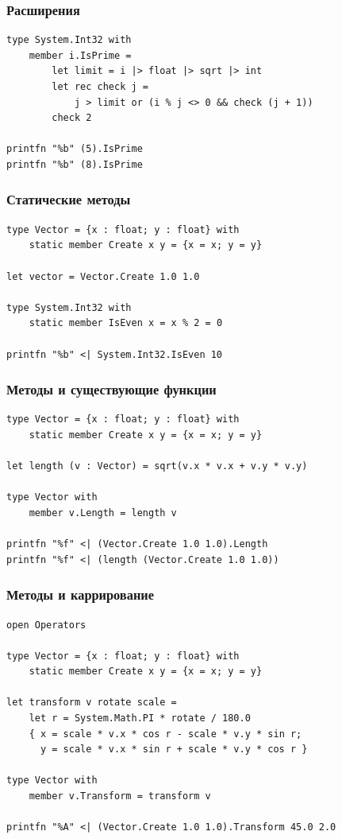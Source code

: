 \documentclass{../../slides-style}
\begin{document}
    \begin{frame}[fragile]
        \frametitle{Расширения}
        \begin{verbatim}
type System.Int32 with
    member i.IsPrime = 
        let limit = i |> float |> sqrt |> int
        let rec check j =
            j > limit or (i % j <> 0 && check (j + 1))
        check 2

printfn "%b" (5).IsPrime
printfn "%b" (8).IsPrime
        \end{verbatim}
    \end{frame}

    \begin{frame}[fragile]
        \frametitle{Статические методы}
        \begin{verbatim}
type Vector = {x : float; y : float} with
    static member Create x y = {x = x; y = y}

let vector = Vector.Create 1.0 1.0

type System.Int32 with
    static member IsEven x = x % 2 = 0

printfn "%b" <| System.Int32.IsEven 10
        \end{verbatim}
    \end{frame}

    \begin{frame}[fragile]
        \frametitle{Методы и существующие функции}
        \begin{verbatim}
type Vector = {x : float; y : float} with
    static member Create x y = {x = x; y = y}

let length (v : Vector) = sqrt(v.x * v.x + v.y * v.y)

type Vector with
    member v.Length = length v

printfn "%f" <| (Vector.Create 1.0 1.0).Length
printfn "%f" <| (length (Vector.Create 1.0 1.0))
        \end{verbatim}
    \end{frame}

    \begin{frame}[fragile]
        \frametitle{Методы и каррирование}
        \begin{verbatim}
open Operators

type Vector = {x : float; y : float} with
    static member Create x y = {x = x; y = y}

let transform v rotate scale = 
    let r = System.Math.PI * rotate / 180.0
    { x = scale * v.x * cos r - scale * v.y * sin r;
      y = scale * v.x * sin r + scale * v.y * cos r }

type Vector with
    member v.Transform = transform v

printfn "%A" <| (Vector.Create 1.0 1.0).Transform 45.0 2.0
        \end{verbatim}
    \end{frame}
    
\end{document}
